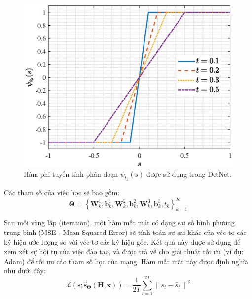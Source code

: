 \begin{figure}[ht]
    \centering
    \includegraphics[width=.8\linewidth]{figures/soft_sign.eps}
    \caption{Hàm phi tuyến tính phân đoạn $\psi_{t_k}(s)$ được sử dụng trong DetNet.}
    \label{fig:soft_sign}
\end{figure}
Các tham số của việc học sẽ bao gồm:
\begin{equation}
\boldsymbol{\Theta}=\left\{\mathbf{W}^1_{k}, \mathbf{b}^1_{k}, \mathbf{W}^2_{k}, \mathbf{b}^2_{k}, \mathbf{W}^3_{k}, \mathbf{b}^3_{ k}, t_k\right\}_{k=1}^K
\end{equation}

Sau mỗi vòng lặp (iteration), một hàm mất mát có dạng sai số bình phương trung bình (MSE - Mean Squared Error) sẽ tính toán sự sai khác của véc-tơ các ký hiệu ước lượng so với véc-tơ các ký hiệu gốc. Kết quả này được sử dụng để xem xét sự hội tụ của việc đào tạo, và được trả về cho giải thuật tối ưu (ví dụ: Adam) để tối ưu các tham số học của mạng. Hàm mất mát này được định nghĩa như dưới đây:
\begin{equation}
\label{eq:lossdetnet}
    \mathcal{L}(\mathbf{s} ; \hat{\mathbf{s}}_{\boldsymbol{\Theta}}(\mathbf{H}, \mathbf{x}))= \frac{1}{2T} \sum_{t=1}^{2T} {\left\| s_t-\hat{s}_t\right\|^2}
\end{equation}

